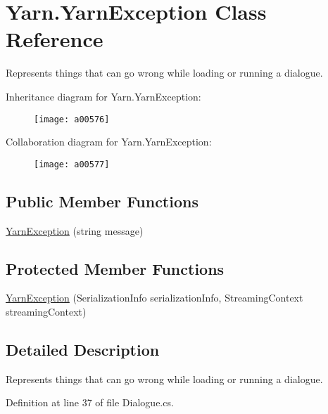 \hypertarget{a00173}{\section{Yarn.\-Yarn\-Exception Class Reference}
\label{a00173}
}


Represents things that can go wrong while loading or running a dialogue.  




Inheritance diagram for Yarn.\-Yarn\-Exception\-:
\nopagebreak
\begin{figure}[H]
\begin{center}
\leavevmode
\texttt{[image: a00576]}
\end{center}
\end{figure}


Collaboration diagram for Yarn.\-Yarn\-Exception\-:
\nopagebreak
\begin{figure}[H]
\begin{center}
\leavevmode
\texttt{[image: a00577]}
\end{center}
\end{figure}
\subsection*{Public Member Functions}
\begin{DoxyCompactItemize}
\item 
\hyperlink{a00173_aa4a1dc51efdfa238aad7f20d76710fd1}{Yarn\-Exception} (string message)
\end{DoxyCompactItemize}
\subsection*{Protected Member Functions}
\begin{DoxyCompactItemize}
\item 
\hyperlink{a00173_a4230584809bc10d063385a96cc23aeb8}{Yarn\-Exception} (Serialization\-Info serialization\-Info, Streaming\-Context streaming\-Context)
\end{DoxyCompactItemize}


\subsection{Detailed Description}
Represents things that can go wrong while loading or running a dialogue. 

Definition at line 37 of file Dialogue.\-cs.



